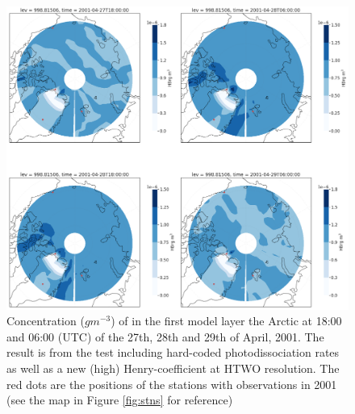 \begin{figure}[h]
    \centering
    \includegraphics[width=\linewidth]{Chapter6_Results/images/polarHBr_HTWO_step3.png}
    \caption{Concentration ($g m^{-3}$) of  in the first model layer the Arctic at 18:00 and 06:00 (UTC) of the 27th, 28th and 29th of April, 2001. The result is from the test including hard-coded photodissociation rates as well as a new (high) Henry-coefficient at HTWO resolution. The red dots are the positions of the stations with observations in 2001 (see the map in Figure \ref{fig:stns} for reference)}
    \label{fig:polarHBr_HTWO_step3}
\end{figure}